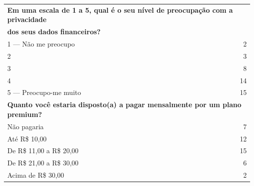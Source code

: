 {\begin{longtable}{p{14.8cm}r}
\multicolumn{2}{l}{\textbf{Em uma escala de 1 a 5, qual é o seu nível de preocupação com a privacidade}} \\
\multicolumn{2}{l}{\textbf{dos seus dados financeiros?}} \\ \midrule
1 — Não me preocupo & 2 \\
2 & 3 \\
3 & 8 \\
4 & 14 \\
5 — Preocupo-me muito & 15 \\ \midrule

\multicolumn{2}{l}{\textbf{Quanto você estaria disposto(a) a pagar mensalmente por um plano premium?}} \\ \midrule
Não pagaria & 7 \\
Até R\$ 10,00 & 12 \\
De R\$ 11,00 a R\$ 20,00 & 15 \\
De R\$ 21,00 a R\$ 30,00 & 6 \\
Acima de R\$ 30,00 & 2 \\

\end{longtable}
}
